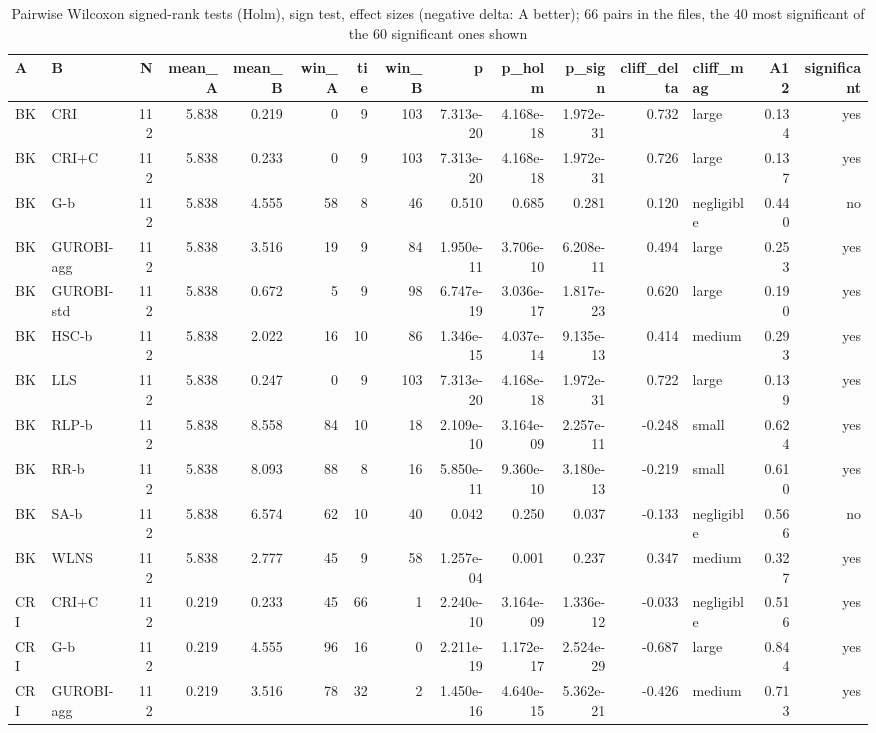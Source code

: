 \begin{table}[htbp]
\centering
\small
\caption{Pairwise Wilcoxon signed-rank tests (Holm), sign test, effect sizes (negative delta: A better); 66 pairs in the files, the 40 most significant of the 60 significant ones shown}
\label{tab:E4a_equal_budgets_b10_pairwise}
\begin{tabular}{llrrrrrrrrrrlrr}
\toprule
A & B & N & mean\_A & mean\_B & win\_A & tie & win\_B & p & p\_holm & p\_sign & cliff\_delta & cliff\_mag & A12 & significant \\
\midrule
BK & CRI & 112 & 5.838 & 0.219 & 0 & 9 & 103 & 7.313e-20 & 4.168e-18 & 1.972e-31 & 0.732 & large & 0.134 & yes \\
BK & CRI+C & 112 & 5.838 & 0.233 & 0 & 9 & 103 & 7.313e-20 & 4.168e-18 & 1.972e-31 & 0.726 & large & 0.137 & yes \\
BK & G-b & 112 & 5.838 & 4.555 & 58 & 8 & 46 & 0.510 & 0.685 & 0.281 & 0.120 & negligible & 0.440 & no \\
BK & GUROBI-agg & 112 & 5.838 & 3.516 & 19 & 9 & 84 & 1.950e-11 & 3.706e-10 & 6.208e-11 & 0.494 & large & 0.253 & yes \\
BK & GUROBI-std & 112 & 5.838 & 0.672 & 5 & 9 & 98 & 6.747e-19 & 3.036e-17 & 1.817e-23 & 0.620 & large & 0.190 & yes \\
BK & HSC-b & 112 & 5.838 & 2.022 & 16 & 10 & 86 & 1.346e-15 & 4.037e-14 & 9.135e-13 & 0.414 & medium & 0.293 & yes \\
BK & LLS & 112 & 5.838 & 0.247 & 0 & 9 & 103 & 7.313e-20 & 4.168e-18 & 1.972e-31 & 0.722 & large & 0.139 & yes \\
BK & RLP-b & 112 & 5.838 & 8.558 & 84 & 10 & 18 & 2.109e-10 & 3.164e-09 & 2.257e-11 & -0.248 & small & 0.624 & yes \\
BK & RR-b & 112 & 5.838 & 8.093 & 88 & 8 & 16 & 5.850e-11 & 9.360e-10 & 3.180e-13 & -0.219 & small & 0.610 & yes \\
BK & SA-b & 112 & 5.838 & 6.574 & 62 & 10 & 40 & 0.042 & 0.250 & 0.037 & -0.133 & negligible & 0.566 & no \\
BK & WLNS & 112 & 5.838 & 2.777 & 45 & 9 & 58 & 1.257e-04 & 0.001 & 0.237 & 0.347 & medium & 0.327 & yes \\
CRI & CRI+C & 112 & 0.219 & 0.233 & 45 & 66 & 1 & 2.240e-10 & 3.164e-09 & 1.336e-12 & -0.033 & negligible & 0.516 & yes \\
CRI & G-b & 112 & 0.219 & 4.555 & 96 & 16 & 0 & 2.211e-19 & 1.172e-17 & 2.524e-29 & -0.687 & large & 0.844 & yes \\
CRI & GUROBI-agg & 112 & 0.219 & 3.516 & 78 & 32 & 2 & 1.450e-16 & 4.640e-15 & 5.362e-21 & -0.426 & medium & 0.713 & yes \\

\end{tabular}
\end{table}
